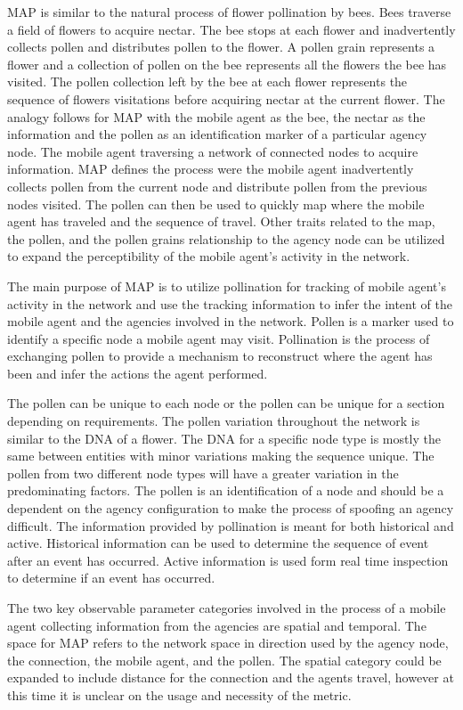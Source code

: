 \documentclass{acm_proc_article-sp}
\begin{document}
MAP is similar to the natural process of flower pollination by bees. Bees traverse a field of flowers to acquire nectar. The bee stops at each flower and inadvertently collects pollen and distributes pollen to the flower. A pollen grain represents a flower and a collection of pollen on the bee represents all the flowers the bee has visited. The pollen collection left by the bee at each flower represents the sequence of flowers visitations before acquiring nectar at the current flower. The analogy follows for MAP with the mobile agent as the bee, the nectar as the information and the pollen as an identification marker of a particular agency node.  The mobile agent traversing a network of connected nodes to acquire information.  MAP defines the process were the mobile agent inadvertently collects pollen from the current node and distribute pollen from the previous nodes visited. The pollen can then be used to quickly map where the mobile agent has traveled and the sequence of travel. Other traits related to the map, the pollen, and the pollen grains relationship to the agency node can be utilized to expand the perceptibility of the mobile agent's activity in the network.    

The main purpose of MAP is to utilize pollination for tracking of mobile agent's activity in the network and use the tracking information to infer the intent of the mobile agent and the agencies involved in the network.  Pollen is a marker used to identify a specific node a mobile agent may visit. Pollination is the process of exchanging pollen to provide a mechanism to reconstruct where the agent has been and infer the actions the agent performed.

The pollen can be unique to each node or the pollen can be unique for a section depending on requirements. The pollen variation throughout the network is similar to the DNA of a flower. The DNA for a specific node type is mostly the same between entities with minor variations making the sequence unique. The pollen from two different node types will have a greater variation in the predominating factors. The pollen is an identification of a node and should be a dependent on the agency configuration to make the process of spoofing an agency difficult. The information provided by pollination is meant for both historical and active. Historical information can be used to determine the sequence of event after an event has occurred. Active information is used form real time inspection to determine if an event has occurred.

The two key observable parameter categories involved in the process of a mobile agent collecting information from the agencies are spatial and temporal. The space for MAP refers to the network space in direction used by the agency node, the connection, the mobile agent, and the pollen.  The spatial category could be expanded to include distance for the connection and the agents travel, however at this time it is unclear on the usage and necessity of the metric.  
\end{document}
